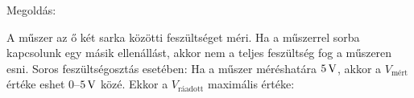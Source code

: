 
\ifdefined\megoldas

 Megoldás: 

 A műszer az ő két sarka közötti feszültséget méri. Ha a műszerrel sorba kapcsolunk egy másik ellenállást, akkor nem a teljes feszültség fog a műszeren esni. Soros feszültségosztás esetében:
 Ha a műszer méréshatára $5\mathrm{\, V}$, akkor a $V_\text{mért}$ értéke eshet $0$--$5\mathrm{\, V}$ közé. Ekkor a $V_\text{ráadott}$ maximális értéke:

\fi